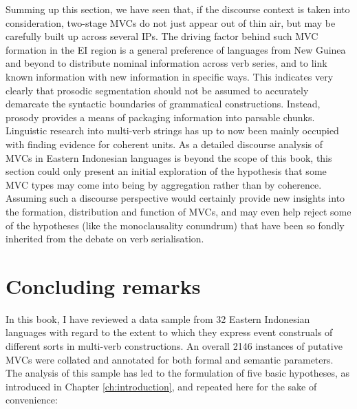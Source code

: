Summing up this section, we have seen that, if the discourse context is taken into consideration, two-stage MVCs do not just appear out of thin air, but may be carefully built up across several IPs. The driving factor behind such MVC formation in the EI region is a general preference of languages from New Guinea and beyond to distribute nominal information across verb series, and to link known information with new information in specific ways. This indicates very clearly that prosodic segmentation should not be assumed to accurately demarcate the syntactic boundaries of grammatical constructions. Instead, prosody provides a means of packaging information into parsable chunks. Linguistic research into multi-verb strings has up to now been mainly occupied with finding evidence for coherent units. As a detailed discourse analysis of MVCs in Eastern Indonesian languages is beyond the scope of this book, this section could only present an initial exploration of the hypothesis that some MVC types may come into being by aggregation rather than by coherence. Assuming such a discourse perspective would certainly provide new insights into the formation, distribution and function of MVCs, and may even help reject some of the hypotheses (like the monoclausality conundrum) that have been so fondly inherited from the debate on verb serialisation.

\section{Concluding remarks} \label{sec:concluding}

In this book, I have reviewed a data sample from 32 Eastern Indonesian languages with regard to the extent to which they express event construals of different sorts in multi-verb constructions. An overall 2146 instances of putative MVCs were collated and annotated for both formal and semantic parameters. The analysis of this sample has led to the formulation of five basic hypotheses, as introduced in Chapter \ref{ch:introduction}, and repeated here for the sake of convenience:

